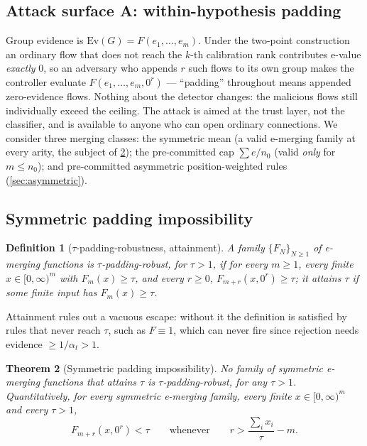 \documentclass[conference]{IEEEtran}
\newtheorem{theorem}{Theorem}
\newtheorem{definition}[theorem]{Definition}
\newcommand{\alphat}{\alpha_t}
\newcommand{\Ev}{\mathrm{Ev}}
\begin{document}
\subsection{Attack surface A: within-hypothesis padding}

Group evidence is $\Ev(G) = F(e_1, \ldots, e_m)$. Under the two-point construction an ordinary flow
that does not reach the $k$-th calibration rank contributes e-value \emph{exactly} $0$, so an
adversary who appends $r$ such flows to its own group makes the controller evaluate
$F(e_1, \ldots, e_m, 0^r)$ --- ``padding'' throughout means appended zero-evidence flows.
Nothing about the detector changes: the malicious flows still individually exceed the ceiling.
The attack is aimed at the trust layer, not the classifier, and is available to anyone who can open
ordinary connections. We consider three merging classes: the symmetric mean (a valid e-merging family at
every arity, the subject of \cref{thm:padding}); the pre-committed cap $\sum e/n_0$ (valid \emph{only}
for $m \le n_0$); and pre-committed asymmetric position-weighted rules (\cref{sec:asymmetric}).

\subsection{Symmetric padding impossibility}

\begin{definition}[$\tau$-padding-robustness, attainment]
A family $\{F_N\}_{N \ge 1}$ of e-merging functions is $\tau$-padding-robust, for $\tau > 1$,
if for every $m \ge 1$, every finite $x \in [0,\infty)^m$ with $F_m(x) \ge \tau$, and every
$r \ge 0$, $F_{m+r}(x, 0^r) \ge \tau$; it \emph{attains} $\tau$ if some finite input has
$F_m(x) \ge \tau$.
\end{definition}

Attainment rules out a vacuous escape: without it the definition is satisfied by rules that never
reach $\tau$, such as $F \equiv 1$, which can never fire since rejection needs evidence
$\ge 1/\alphat > 1$.

\begin{theorem}[Symmetric padding impossibility]\label{thm:padding}
No family of symmetric e-merging functions that attains $\tau$ is $\tau$-padding-robust, for
any $\tau > 1$. Quantitatively, for every symmetric e-merging family, every finite
$x \in [0,\infty)^m$ and every $\tau > 1$,
\[
F_{m+r}(x, 0^r) < \tau \qquad\text{whenever}\qquad r > \frac{\sum_i x_i}{\tau} - m.
\]
\end{theorem}
\end{document}
